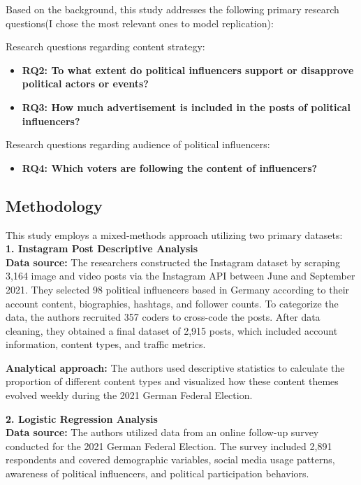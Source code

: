 \documentclass[12pt, a4paper]{article}
\begin{document}
	Based on the background, this study addresses the following primary research questions(I chose the most relevant ones to model replication):
	
	Research questions regarding content strategy:
	\begin{itemize}[itemsep=0.5em]
		\item \textbf{RQ2: To what extent do political influencers support or disapprove political actors or events?}
		\item \textbf{RQ3: How much advertisement is included in the posts of political influencers?}
	\end{itemize}
	
	Research questions regarding audience of political influencers:
	\begin{itemize}[itemsep=0.5em]
		\item \textbf{RQ4: Which voters are following the content of influencers?}
	\end{itemize}
	
	\subsection{Methodology}
	This study employs a mixed-methods approach utilizing two primary datasets:\\
	\textbf{1. Instagram Post Descriptive Analysis} \\
	\textbf{Data source:} The researchers constructed the Instagram dataset by scraping 3,164 image and video posts via the Instagram API between June and September 2021. They selected 98 political influencers based in Germany according to their account content, biographies, hashtags, and follower counts. To categorize the data, the authors recruited 357 coders to cross-code the posts. After data cleaning, they obtained a final dataset of 2,915 posts, which included account information, content types, and traffic metrics.
	
	\textbf{Analytical approach:} The authors used descriptive statistics to calculate the proportion of different content types and visualized how these content themes evolved weekly during the 2021 German Federal Election.
	
	\vspace{1em}
	
	\textbf{2. Logistic Regression Analysis} \\
	\textbf{Data source:} The authors utilized data from an online follow-up survey conducted for the 2021 German Federal Election. The survey included 2,891 respondents and covered demographic variables, social media usage patterns, awareness of political influencers, and political participation behaviors.
	
\end{document}
